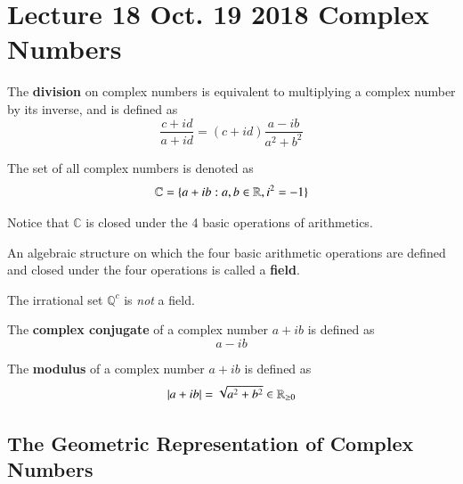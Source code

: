 \documentclass[10pt]{article}
\begin{document}
	\section{Lecture 18 Oct. 19 2018 Complex Numbers}
	\begin{definition}
		The \textbf{division} on complex numbers is equivalent to multiplying a complex number by its inverse, and is defined as 
		\[
			\frac{c+id}{a+id} = (c+id) \frac{a-ib}{a^2 + b^2}
		\]
	\end{definition}
	
	\begin{notation}
		The set of all complex numbers is denoted as 
		\[
			\mathbb{C} = \{ a + ib : a, b \in \mathbb{R}, i^2 = - 1\}
		\]
	\end{notation}
	
	\begin{remark}
		Notice that $\mathbb{C}$ is closed under the 4 basic operations of arithmetics.
	\end{remark}
	
	\begin{definition}
		An algebraic structure on which the four basic arithmetic operations are defined and closed under the four operations is called a \textbf{field}.
	\end{definition}
	
	\begin{example}
		The irrational set $\mathbb{Q}^c$ is \emph{not} a field.
	\end{example}
	
	\begin{definition}
		The \textbf{complex conjugate} of a complex number $a + ib$ is defined as 
		\[
			a - ib
		\]
	\end{definition}
	
	\begin{definition}
		The \textbf{modulus} of a complex number $a + ib$ is defined as 
		\[
			|a + ib| = \sqrt{a^2 + b^2} \in \mathbb{R}_{\geq 0}
		\]
	\end{definition}
	
	\subsection{The Geometric Representation of Complex Numbers}
	
\end{document}
